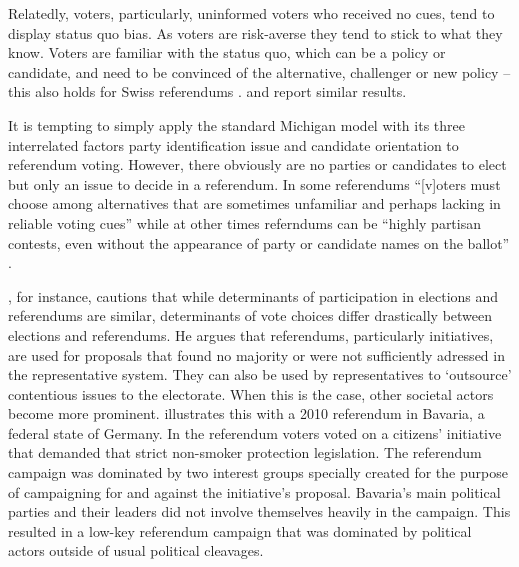\documentclass[11pt,a4paper]{article}\usepackage[]{graphicx}\usepackage[]{color}
\begin{document}
    Relatedly, voters, particularly, uninformed voters who received no cues, tend to display status quo bias. As voters are risk-averse they tend to stick to what they know. Voters are familiar with the status quo, which can be a policy or candidate, and need to be convinced of the alternative, challenger or new policy -- this also holds for Swiss referendums \citep{brunetti_status_1997}. %
    \citet{buri_grunde_1993} and \citet{christin_interests_2002} report similar results. 
    
    It is tempting to simply apply the standard Michigan model with its three interrelated factors party identification issue and candidate orientation to referendum voting. However, there obviously are no parties or candidates to elect but only an issue to decide in a referendum. In some referendums ``[v]oters must choose among alternatives that are sometimes unfamiliar and perhaps lacking in reliable voting cues'' while at other times referndums can be ``highly partisan contests, even without the appearance of party or candidate names on the ballot'' \citep[711]{leduc_opinion_2002}. 
    
    \citet{schoen_wahlen_2012}, for instance, cautions that while determinants of participation in elections and referendums are similar, determinants of vote choices differ drastically between elections and referendums. He argues that referendums, particularly initiatives, are used for proposals that found no majority or were not sufficiently adressed in the representative system. They can also be used by representatives to `outsource' contentious issues to the electorate. When this is the case, other societal actors become more prominent. \citet{schoen_wahlen_2012} illustrates this with a 2010 referendum in Bavaria, a federal state of Germany. In the referendum voters voted on a citizens' initiative that demanded that strict non-smoker protection legislation. The referendum campaign was dominated by two interest groups specially created for the purpose of campaigning for and against the initiative’s proposal. Bavaria’s main political parties and their leaders did not involve themselves heavily in the campaign. This resulted in a low-key referendum campaign that was dominated by political actors outside of usual political cleavages. 
    
\end{document}
